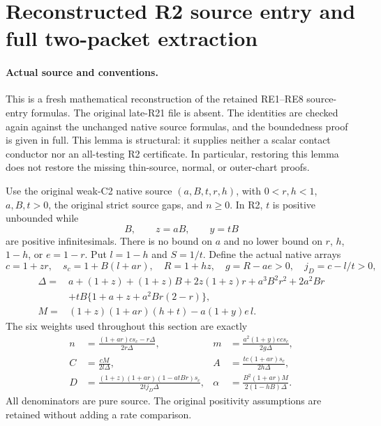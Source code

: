 \section{\texorpdfstring{Reconstructed R2 source entry and full two-packet extraction}{Reconstructed R2 source entry and full two-packet extraction}}
\label{component:p667905169990}

\label{p667905169990:sec:r2-reconstructed-source-entry}

\paragraph{Actual source and conventions.}
This is a fresh mathematical reconstruction of the retained RE1--RE8
source-entry formulas.  The original late-R21 file is absent.  The
identities are checked again against the unchanged native source
formulas, and the boundedness proof is given in full.  This lemma is
structural: it supplies neither a scalar contact conductor nor an
all-testing R2 certificate.  In particular, restoring this lemma does
not restore the missing thin-source, normal, or outer-chart proofs.

Use the original weak-C2 native source $(a,B,t,r,h)$, with
$0<r,h<1$, $a,B,t>0$, the original strict source gaps, and $n\geq0$.
In R2, $t$ is positive unbounded while
\[
 B,\qquad z=aB,\qquad y=tB
\]
are positive infinitesimals.  There is no bound on $a$ and no lower
bound on $r$, $h$, $1-h$, or $e=1-r$.  Put $l=1-h$ and $S=1/t$.
Define the actual native arrays
\[
 c=1+zr,\quad s_c=1+B(l+ar),\quad
 R=1+hz,\quad g=R-ae>0,\quad j_D=c-l/t>0,
\]
\begin{align*}
 \Delta={}&a+(1+z)+(1+z)B+2z(1+z)r
          +a^3B^2r^2+2a^2Br\\
          &+tB\{1+a+z+a^2Br(2-r)\},\\
 M={}&(1+z)(1+ar)(h+t)-a(1+y)e\,l.
\end{align*}
The six weights used throughout this section are exactly
\[
\begin{aligned}
 n&=\frac{(1+ar)c s_c-r\Delta}{2r\Delta},&
 m&=\frac{a^2(1+y)e c s_c}{2g\Delta},\\
 C&=\frac{cM}{2l\Delta},&
 A&=\frac{tc(1+ar)s_c}{2h\Delta},\\
 D&=\frac{(1+z)(1+ar)(1-atBr)s_c}{2t j_D\Delta},&
 \alpha&=\frac{B^2(1+ar)M}{2(1-hB)\Delta}.
\end{aligned}                                                     \tag{RER1}
\]
All denominators are pure source.  The original positivity assumptions
are retained without adding a rate comparison.

